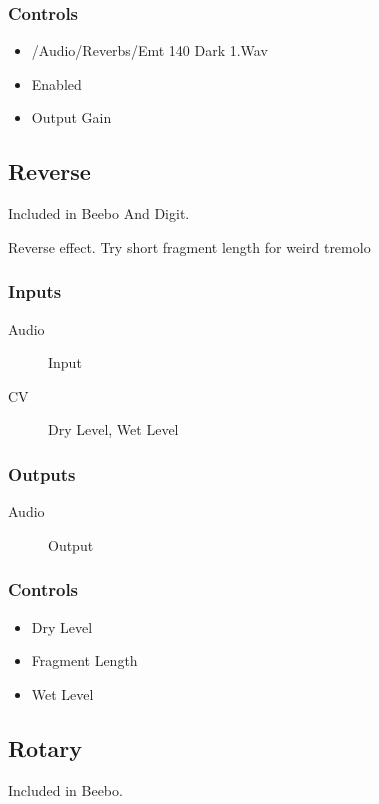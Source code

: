 \subsubsection{Controls}
\begin{itemize}
\item /Audio/Reverbs/Emt 140 Dark 1.Wav
\item Enabled
\item Output Gain
\end{itemize}

\subsection{Reverse}

Included in Beebo And Digit.

Reverse effect. Try short fragment length for weird tremolo



\subsubsection{Inputs}
\begin{description}
\item [Audio] Input
\item [CV] Dry Level, Wet Level
\end{description}

\subsubsection{Outputs}
\begin{description}
\item [Audio] Output
\end{description}

\subsubsection{Controls}
\begin{itemize}
\item Dry Level
\item Fragment Length
\item Wet Level
\end{itemize}

\subsection{Rotary}

Included in Beebo.

